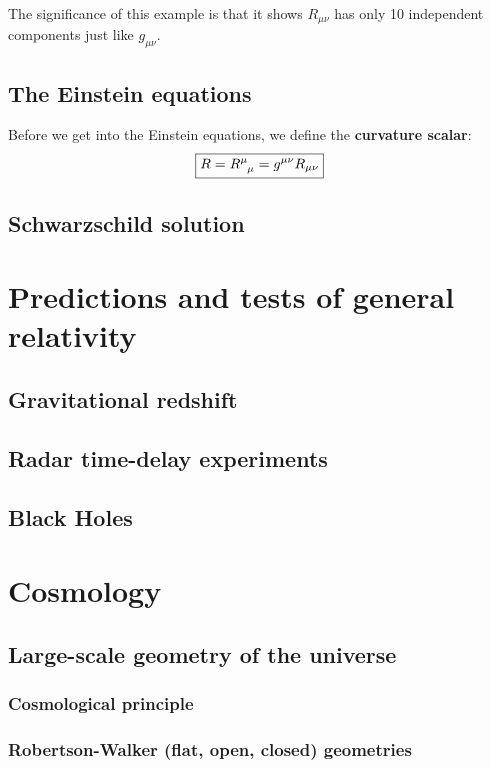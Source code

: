 \documentclass{article}
\theoremstyle{definition}
\begin{document}
The significance of this example is that it shows $R_{\mu\nu}$ has only 10 independent components just like $g_{\mu\nu}$.

\subsection{The Einstein equations}
Before we get into the Einstein equations, we define the \textbf{curvature scalar}:
\begin{align*}
\boxed{R = \tensor{R}{^{\mu}_{\mu}} = g^{\mu\nu}R_{\mu\nu}}
\end{align*}

\subsection{Schwarzschild solution}

\newpage

\section{Predictions and tests of general relativity}
\subsection{Gravitational redshift}
\subsection{Radar time-delay experiments}
\subsection{Black Holes}

\newpage

\section{Cosmology}
\subsection{Large-scale geometry of the universe}
\subsubsection{Cosmological principle}
\subsubsection{Robertson-Walker (flat, open, closed) geometries}
\end{document}
